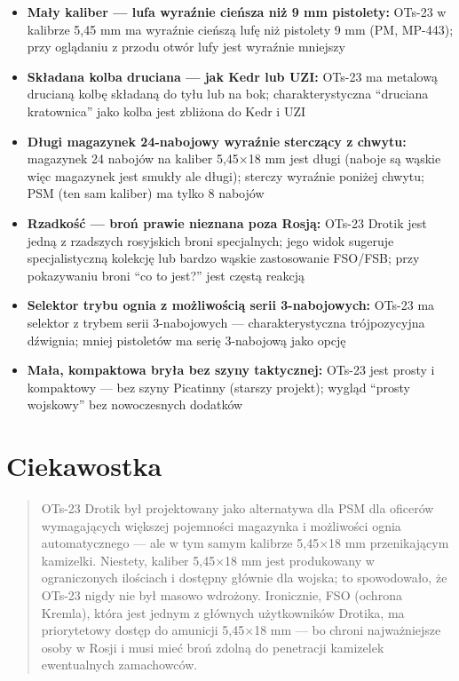 \documentclass[12pt,openany,oneside]{book}
\providecommand{\tightlist}{%
  \setlength{\itemsep}{0pt}\setlength{\parskip}{0pt}}
\begin{document}
\begin{itemize}
\tightlist
\item
  \textbf{Mały kaliber --- lufa wyraźnie cieńsza niż 9 mm pistolety:}
  OTs-23 w kalibrze 5,45 mm ma wyraźnie cieńszą lufę niż pistolety 9 mm
  (PM, MP-443); przy oglądaniu z przodu otwór lufy jest wyraźnie
  mniejszy
\item
  \textbf{Składana kolba druciana --- jak Kedr lub UZI:} OTs-23 ma
  metalową drucianą kolbę składaną do tyłu lub na bok; charakterystyczna
  ``druciana kratownica'' jako kolba jest zbliżona do Kedr i UZI
\item
  \textbf{Długi magazynek 24-nabojowy wyraźnie sterczący z chwytu:}
  magazynek 24 nabojów na kaliber 5,45×18 mm jest długi (naboje są
  wąskie więc magazynek jest smukły ale długi); sterczy wyraźnie poniżej
  chwytu; PSM (ten sam kaliber) ma tylko 8 nabojów
\item
  \textbf{Rzadkość --- broń prawie nieznana poza Rosją:} OTs-23 Drotik
  jest jedną z rzadszych rosyjskich broni specjalnych; jego widok
  sugeruje specjalistyczną kolekcję lub bardzo wąskie zastosowanie
  FSO/FSB; przy pokazywaniu broni ``co to jest?'' jest częstą reakcją
\item
  \textbf{Selektor trybu ognia z możliwością serii 3-nabojowych:} OTs-23
  ma selektor z trybem serii 3-nabojowych --- charakterystyczna
  trójpozycyjna dźwignia; mniej pistoletów ma serię 3-nabojową jako
  opcję
\item
  \textbf{Mała, kompaktowa bryła bez szyny taktycznej:} OTs-23 jest
  prosty i kompaktowy --- bez szyny Picatinny (starszy projekt); wygląd
  ``prosty wojskowy'' bez nowoczesnych dodatków
\end{itemize}

\section{Ciekawostka}\label{ciekawostka-95}

\begin{quote}
OTs-23 Drotik był projektowany jako alternatywa dla PSM dla oficerów
wymagających większej pojemności magazynka i możliwości ognia
automatycznego --- ale w tym samym kalibrze 5,45×18 mm przenikającym
kamizelki. Niestety, kaliber 5,45×18 mm jest produkowany w ograniczonych
ilościach i dostępny głównie dla wojska; to spowodowało, że OTs-23 nigdy
nie był masowo wdrożony. Ironicznie, FSO (ochrona Kremla), która jest
jednym z głównych użytkowników Drotika, ma priorytetowy dostęp do
amunicji 5,45×18 mm --- bo chroni najważniejsze osoby w Rosji i musi
mieć broń zdolną do penetracji kamizelek ewentualnych zamachowców.
\end{quote}
\end{document}
